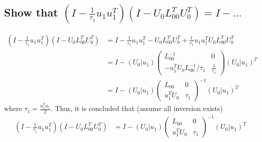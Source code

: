 \documentclass[11pt,a4paper]{article}
\begin{document}
\subsection{Show that $(I - \frac{1}{\tau_1} u_1 u_1^T) (I - U_0 L_{00}^T U_0^T) = I - ... $}
\begin{align}
    (I - \frac{1}{\tau_1} u_1 u_1^T) (I - U_0 L_{00}^T U_0^T) 
   &= I - \frac{1}{\tau_1} u_1 u_1^T - U_0 L_{00}^T U_0^T
   + \frac{1}{\tau_1} u_1 u_1^T U_0 L_{00}^T U_0^T \\
   &= I - (U_0 | u_1) 
      \left( \begin{array}{c|c} 
              L_{00}^{-1} & 0 \\ \hline
              - u_1^T U_0 L_{00}^{-1}/\tau_1 & \frac{1}{\tau_1}
          \end{array} \right)
   (U_0 | u_1)^{T}  \\
   &= I - (U_0 | u_1) 
      \left( \begin{array}{c|c} 
              L_{00} & 0 \\ \hline
               u_1^T U_0 & \tau_1
           \end{array} \right)^{-1}
   (U_0 | u_1)^{T} 
\end{align}
where $\tau_1 = \frac{u_1^T u_1}{2}$.
Thus, it is concluded that (assume all inversion exists)
\begin{align}
    (I - \frac{1}{\tau_1} u_1 u_1^T) (I - U_0 L_{00}^T U_0^T) 
  &= I - (U_0 | u_1) 
      \left( \begin{array}{c|c} 
              L_{00} & 0 \\ \hline
               u_1^T U_0 & \tau_1
           \end{array} \right)^{-1}
   (U_0 | u_1)^{T} 
\end{align}

\newpage
\end{document}

